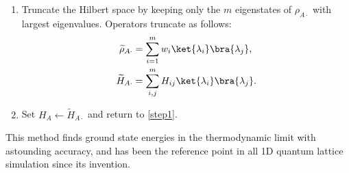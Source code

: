 \begin{enumerate}
  \item Truncate the Hilbert space by keeping only the $m$ eigenstates of
  $\rho_{A \cdot}$ with largest eigenvalues. Operators truncate as follows:
  \begin{align}
    \widetilde{\rho}_{A \cdot} & = \sum_{i = 1}^{m} w_i \ket{\lambda_i}\bra{\lambda_j}, \\
    \widetilde{H}_{A \cdot} & = \sum_{i, j}^{m} H_{ij} \ket{\lambda_i}\bra{\lambda_j}.
  \end{align}

  \item Set $H_{A} \leftarrow \widetilde{H}_{A \cdot}$ and return to \ref{step1}.

\end{enumerate}

This method finds ground state energies in the thermodynamic limit with astounding accuracy, and has been
the reference point in all 1D quantum lattice simulation since its invention.
